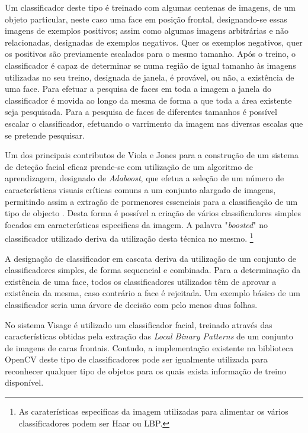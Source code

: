 Um classificador deste tipo é treinado com algumas centenas de imagens, de um objeto particular, neste caso uma face em posição frontal, designando-se essas imagens de exemplos positivos; assim como algumas imagens arbitrárias e não relacionadas, designadas de exemplos negativos. Quer os exemplos negativos, quer os positivos são previamente escalados para o mesmo tamanho. Após o treino, o classificador é capaz de determinar se numa região de igual tamanho às imagens utilizadas no seu treino, designada de janela, é provável, ou não,  a existência de uma face. Para efetuar a pesquisa de faces em toda a imagem a janela do classificador é movida ao longo da mesma de forma a que toda a área existente seja pesquisada. Para a pesquisa de faces de diferentes tamanhos é possível escalar o classificador, efetuando o varrimento da imagem nas diversas escalas que se pretende pesquisar.

Um dos principais contributos de Viola e Jones para a construção de um sistema de deteção facial eficaz prende-se com utilização de um algoritmo de aprendizagem, designado de \textit{Adaboost}, que efetua a seleção de um número de características visuais críticas comuns a um conjunto alargado de imagens, permitindo assim a extração de pormenores essenciais para a classificação de um tipo de objecto \cite{Viola2001}. Desta forma é possível a criação de vários classificadores simples focados em características especificas da imagem. A palavra "\textit{boosted}" no classificador utilizado deriva da utilização desta técnica no mesmo. \footnote{As caraterísticas especificas da imagem utilizadas para alimentar os vários classificadores podem ser Haar ou LBP.}
 
A designação de classificador em cascata deriva da utilização de um conjunto de classificadores simples, de forma sequencial e combinada. Para a determinação da existência de uma face, todos os classificadores utilizados  têm de aprovar a existência da mesma, caso contrário a face é rejeitada. Um exemplo básico de um classificador seria uma árvore de decisão com pelo menos duas folhas.

No sistema Visage é utilizado um classificador facial, treinado através das características obtidas pela extração das \textit{Local Binary Patterns} \cite{Ahonen2006} de um conjunto de imagens de caras frontais. Contudo, a implementação existente na biblioteca OpenCV deste tipo de classificadores pode ser igualmente utilizada para reconhecer qualquer tipo de objetos para os quais exista informação de treino disponível.

